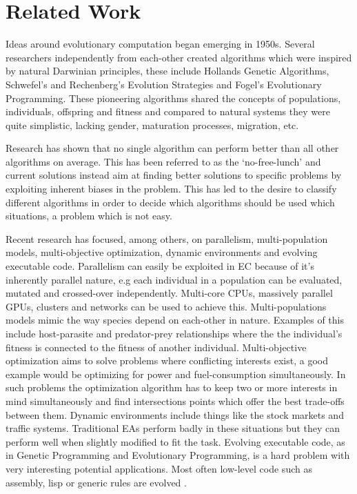 \section{Related Work}

Ideas around evolutionary computation began emerging in 1950s. Several researchers independently from each-other created algorithms which were inspired by natural Darwinian principles, these include Hollands Genetic Algorithms, Schwefel's and Rechenberg's Evolution Strategies and Fogel's Evolutionary Programming. These pioneering algorithms shared the concepts of populations, individuals, offspring and fitness and compared to natural systems they were quite simplistic, lacking gender, maturation processes, migration, etc.

Research has shown that no single algorithm can perform better than all other algorithms on average. This has been referred to as the `no-free-lunch' and current solutions instead aim at finding better solutions to specific problems by exploiting inherent biases in the problem. This has led to the desire to classify different algorithms in order to decide which algorithms should be used which situations, a problem which is not easy.

Recent research has focused, among others, on parallelism, multi-population models, multi-objective optimization, dynamic environments and evolving executable code. Parallelism can easily be exploited in EC because of it's inherently parallel nature, e.g each individual in a population can be evaluated, mutated and crossed-over independently. Multi-core CPUs, massively parallel GPUs, clusters and networks can be used to achieve this. Multi-populations models mimic the way species depend on each-other in nature. Examples of this include host-parasite and predator-prey relationships where the the individual's fitness is connected to the fitness of another individual. Multi-objective optimization aims to solve problems where conflicting interests exist, a good example would be optimizing for power and fuel-consumption simultaneously. In such problems the optimization algorithm has to keep two or more interests in mind simultaneously and find intersections points which offer the best trade-offs between them. Dynamic environments include things like the stock markets and traffic systems. Traditional EAs perform badly in these situations but they can perform well when slightly modified to fit the task. Evolving executable code, as in Genetic Programming and Evolutionary Programming, is a hard problem with very interesting potential applications. Most often low-level code such as assembly, lisp or generic rules are evolved \cite{dejong2009EC}.




